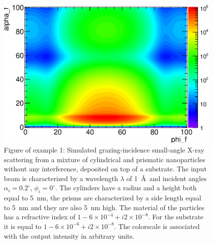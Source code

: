 \begin{figure}[h]
  \begin{center}
   \includegraphics[clip=true, width=120mm]{Figures/Manual_ex1.eps}
  \end{center}
  \caption[Example 1: Simulated grazing-incidence small-angle X-ray scattering from a mixture of
cylindrical and prismatic nanoparticles without any interference, deposited on top
of a substrate]{Figure of example 1: Simulated grazing-incidence small-angle X-ray scattering from a mixture of
cylindrical and prismatic nanoparticles without any interference, deposited on top
of a substrate. The input beam is characterized by a wavelength
$\lambda$ of 1~\AA\ and incident angles $\alpha_i=0.2^{\circ}$, $\phi_i=0^{\circ}$. The
cylinders have a radius and a height both equal to 5~nm, the prisms
are characterized by a side length equal to 5~nm and they are also 5~nm high. The
material of the particles has a refractive index of $1-6\times 10^{-4}+i2\times 10^{-8}$. For the substrate
it is equal to $1-6\times 10^{-6} +i2\times 10^{-8} $. The colorscale
is associated with the output intensity in arbitrary units. }
\label{fig:output_ex1}
\end{figure}

